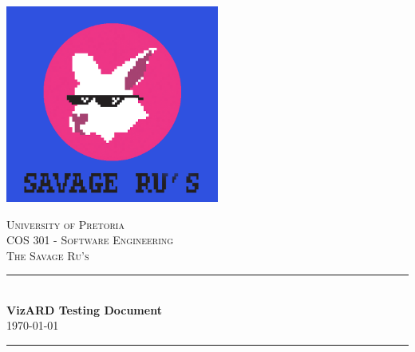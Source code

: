 \documentclass[a4paper,12pt]{article}
\begin{document}
\begin{titlepage}

\newcommand{\HRule}{\rule{\linewidth}{0.5mm}} %

\center %
 
\begin{center}
	\includegraphics[width=7cm]{../../Images/SavageRus.png}
\end{center}	
\vfill
\textsc{\LARGE University of Pretoria}\\[1.5cm]
\textsc{\Large COS 301 - Software Engineering}\\[0.5cm]
\textsc{\large The Savage Ru's}\\[0.5cm]


\HRule \\[0.4cm]
{ \huge \bfseries VizARD Testing Document}\\[0.4cm] %
{\large \today}
\HRule \\[1.5cm]
 


\end{titlepage}
\end{document}
